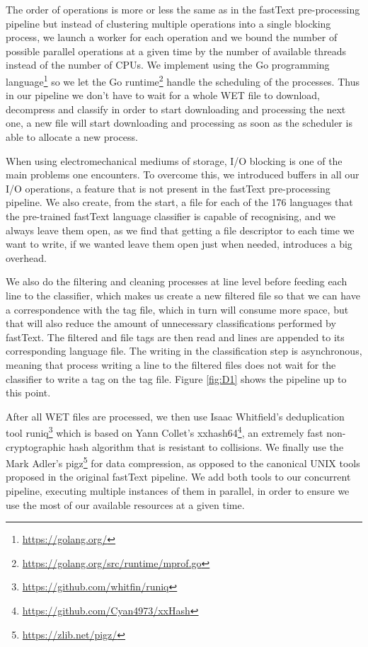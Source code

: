 The order of operations is more or less the same as in the fastText pre-processing pipeline but instead of clustering multiple operations into a single blocking process, we launch a worker for each operation and we bound the number of possible parallel operations at a given time by the number of available threads instead of the number of CPUs. We implement \goclassy using the Go programming language\footnote{\url{https://golang.org/}} so we let the Go runtime\footnote{\url{https://golang.org/src/runtime/mprof.go}} handle the scheduling of the processes. Thus in our pipeline we don't have to wait for a whole WET file to download, decompress and classify in order to start downloading and processing the next one, a new file will start downloading and processing as soon as the scheduler is able to allocate a new process.

When using electromechanical mediums of storage, I/O blocking is one of the main problems one encounters. To overcome this, we introduced buffers in all our I/O operations, a feature that is not present in the fastText pre-processing pipeline. We also create, from the start, a file for each of the 176 languages that the pre-trained fastText language classifier is capable of recognising, and we always leave them open, as we find that getting a file descriptor to each time we want to write, if we wanted leave them open just when needed, introduces a big overhead.

We also do the filtering and cleaning processes at line level before feeding each line to the classifier, which makes us create a new filtered file so that we can have a correspondence with the tag file, which in turn will consume more space, but that will also reduce the amount of unnecessary classifications performed by fastText. The filtered and file tags are then read and lines are appended to its corresponding language file. The writing in the classification step is asynchronous, meaning that process writing a line to the filtered files does not wait for the classifier to write a tag on the tag file. Figure \ref{fig:D1} shows the pipeline up to this point.

After all WET files are processed, we then use Isaac Whitfield's deduplication tool runiq\footnote{\url{https://github.com/whitfin/runiq}} which is based on Yann Collet's xxhash64\footnote{\url{https://github.com/Cyan4973/xxHash}}, an extremely fast non-cryptographic hash algorithm that is resistant to collisions. We finally use the Mark Adler's pigz\footnote{\url{https://zlib.net/pigz/}} for data compression, as opposed to the canonical UNIX tools proposed in the original fastText pipeline. We add both tools to our concurrent pipeline, executing multiple instances of them in parallel, in order to ensure we use the most of our available resources at a given time.

